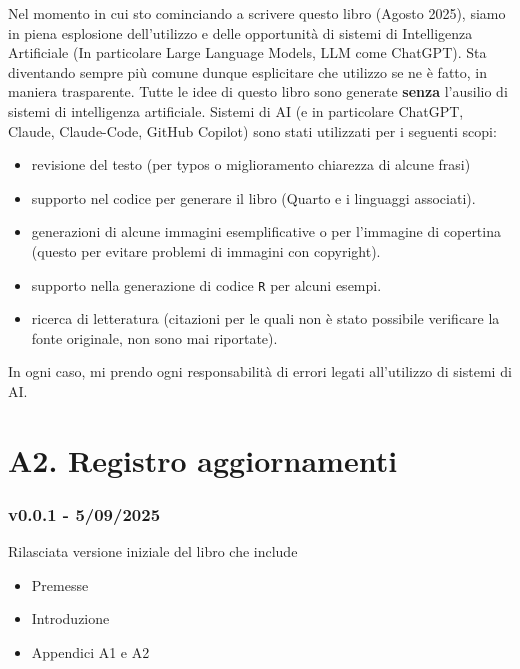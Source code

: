 \documentclass[
  italian,
  letterpaper,
  paper=6in:9in,
  pagesize=pdftex,
  headinclude=on,
  footinclude=on,
  11pt]{scrbook}
\providecommand{\tightlist}{%
  \setlength{\itemsep}{0pt}\setlength{\parskip}{0pt}}
\begin{document}
Nel momento in cui sto cominciando a scrivere questo libro (Agosto
2025), siamo in piena esplosione dell'utilizzo e delle opportunità di
sistemi di Intelligenza Artificiale (In particolare Large Language
Models, LLM come ChatGPT). Sta diventando sempre più comune dunque
esplicitare che utilizzo se ne è fatto, in maniera trasparente. Tutte le
idee di questo libro sono generate \textbf{senza} l'ausilio di sistemi
di intelligenza artificiale. Sistemi di AI (e in particolare ChatGPT,
Claude, Claude-Code, GitHub Copilot) sono stati utilizzati per i
seguenti scopi:

\begin{itemize}
\tightlist
\item
  revisione del testo (per typos o miglioramento chiarezza di alcune
  frasi)
\item
  supporto nel codice per generare il libro (Quarto e i linguaggi
  associati).
\item
  generazioni di alcune immagini esemplificative o per l'immagine di
  copertina (questo per evitare problemi di immagini con copyright).
\item
  supporto nella generazione di codice \texttt{R} per alcuni esempi.
\item
  ricerca di letteratura (citazioni per le quali non è stato possibile
  verificare la fonte originale, non sono mai riportate).
\end{itemize}

In ogni caso, mi prendo ogni responsabilità di errori legati
all'utilizzo di sistemi di AI.

\chapter*{A2. Registro aggiornamenti}\label{registro_aggiornamenti}


\subsection*{v0.0.1 - 5/09/2025}\label{v0.0.1---5092025}

Rilasciata versione iniziale del libro che include

\begin{itemize}
\tightlist
\item
  Premesse
\item
  Introduzione
\item
  Appendici A1 e A2
\end{itemize}
\end{document}
